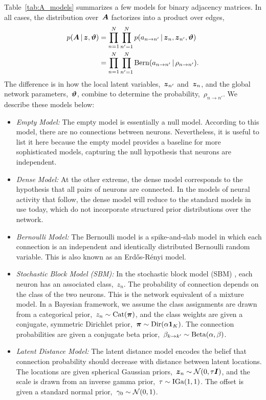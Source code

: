 Table~\ref{tab:A_models} summarizes a few models for binary adjacency
matrices. In all cases, the distribution over~$\boldsymbol{A}$ factorizes into a
product over edges,
\begin{align*}
  p(\boldsymbol{A} \,|\, \boldsymbol{z}, \boldsymbol{\vartheta})
  &= \prod_{n=1}^N \prod_{n'=1}^N p(a_{n \to n'} \,|\, \boldsymbol{z}_n, \boldsymbol{z}_{n'}, \boldsymbol{\vartheta}) \\
  &= \prod_{n=1}^N \prod_{n'=1}^N \mathrm{Bern}(a_{n \to n'} \,|\, \rho_{n \to n'}).
\end{align*}
The difference is in how the local latent variables,~$\boldsymbol{z}_{n'}$
and~$\boldsymbol{z}_n$, and the global network parameters,~$\boldsymbol{\vartheta}$, combine to
determine the probability,~$\rho_{n \to n'}$. We describe these models
below:
\begin{itemize}
\item \textit{Empty Model: } The empty model is essentially a null
  model. According to this model, there are no connections between
  neurons. Nevertheless, it is useful to list it here because
  the empty model provides a baseline for more sophisticated models,
  capturing the null hypothesis that neurons are independent. 
  
\item \textit{Dense Model: } At the other extreme, the dense model
  corresponds to the hypothesis that all pairs of neurons are
  connected. In the models of neural activity that follow, the
  dense model will reduce to the standard models in use today, which
  do not incorporate structured prior distributions over the network.
  
\item \textit{Bernoulli Model: } The Bernoulli model is a
  spike-and-slab model in which each connection is an independent and
  identically distributed Bernoulli random variable. 
  This is also known as an Erd\H{o}s-R\'enyi model.
  
\item \textit{Stochastic Block Model (SBM): } In the stochastic block
  model (SBM) \citep{Nowicki-2001}, each neuron has an associated
  class,~$z_n$.  The probability of connection depends on the class of
  the two neurons.  This is the network equivalent of a mixture model.
  In a Bayesian framework, we assume the class assignments are drawn
  from a categorical prior,~${z_n \sim \mathrm{Cat}(\boldsymbol{\pi})}$, and
  the class weights are given a conjugate, symmetric Dirichlet
  prior,~${\boldsymbol{\pi} \sim \mathrm{Dir}(\alpha \boldsymbol{1}_K)}$. The connection
  probabilities are given a conjugate beta prior,~${\beta_{k \to k'}
    \sim \mathrm{Beta}(\alpha, \beta)}$.
  
\item \textit{Latent Distance Model: } The latent distance model
  \citep{Hoff-2008} encodes the belief that connection probability
  should decrease with distance between latent locations. The
  locations are given spherical Gaussian priors,~$\boldsymbol{z}_n \sim
  \mathcal{N}(0, \tau \boldsymbol{I})$, and the scale is drawn from an inverse
  gamma prior,~$\tau \sim \mathrm{IGa}(1,1)$. The offset is given a
  standard normal prior,~$\gamma_0 \sim \mathcal{N}(0, 1)$.

\end{itemize}


